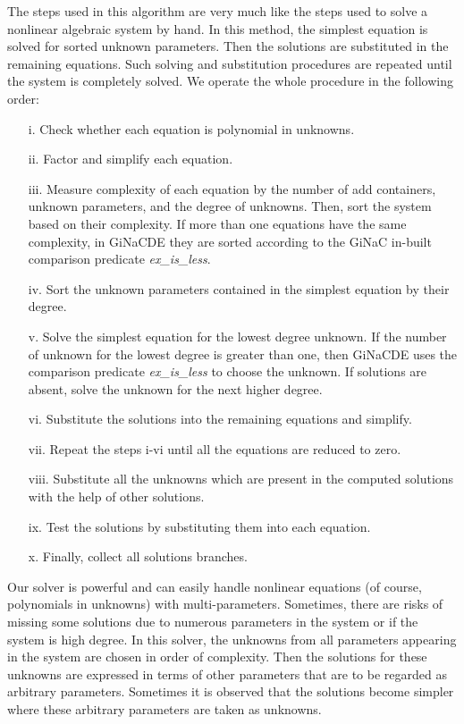 \documentclass[prd,aps,floats,showkeys,nofootinbib,notitlepage]{revtex4-2}
\begin{document}
	The steps used in this algorithm are very much like the steps used to solve a nonlinear algebraic system by hand. In this method, the simplest equation is solved for sorted unknown parameters. Then the solutions are substituted in the remaining equations. Such solving and substitution procedures are repeated until the system is completely solved. We operate the whole procedure in the following order:
	\begin{itemize}
		\item[i.] Check whether each equation is polynomial in unknowns.
		\item[ii.] Factor and simplify each equation.
		\item[iii.] Measure complexity of each equation by the number of add containers, unknown parameters, and the degree of unknowns. Then, sort the system based on their complexity. If more than one equations have the same complexity, in GiNaCDE they are sorted according to the GiNaC in-built comparison predicate {\em ex\_is\_less}.
		\item[iv.] Sort the unknown parameters contained in the simplest equation by their degree.
		\item[v.] Solve the simplest equation for the lowest degree unknown. If the number of unknown for the lowest degree is greater than one, then GiNaCDE uses the comparison predicate {\em ex\_is\_less} to choose the unknown. If solutions are absent, solve the unknown for the next higher degree. 
		\item[vi.] Substitute the solutions into the remaining equations and simplify.
		\item[vii.] Repeat the steps i-vi until all the equations are reduced to zero.
		\item[viii.] Substitute all the unknowns which are present in the computed solutions with the help of other solutions.
		\item[ix.] Test the solutions by substituting them into each equation.
		\item[x.] Finally, collect all solutions branches.
	\end{itemize}
	Our solver is powerful and can easily handle nonlinear equations (of course, polynomials in unknowns) with multi-parameters. Sometimes, there are risks of missing some solutions due to numerous parameters in the system or if the system is high degree. In this solver, the unknowns from all parameters appearing in the system are chosen in order of complexity. Then the solutions for these unknowns are expressed in terms of other parameters that are to be regarded as arbitrary parameters. Sometimes it is observed that the solutions become simpler where these arbitrary parameters are taken as unknowns.\\
	
\end{document}
